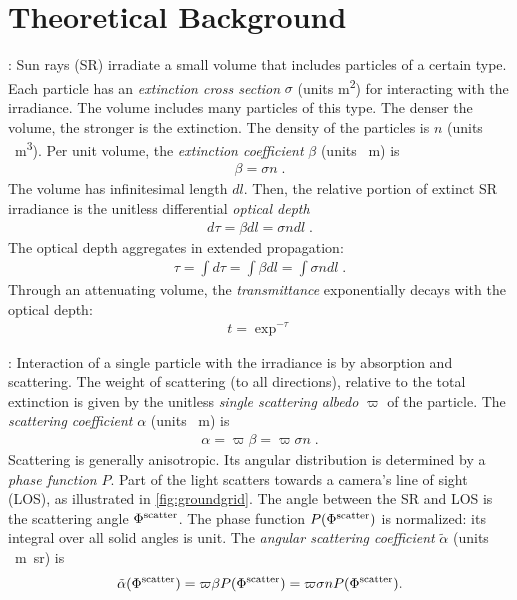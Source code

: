 \documentclass[10pt,letterpaper]{article}
\begin{document}

\section{Theoretical Background}
\label{sec:theor-backgr}

: Sun rays (SR) irradiate a small volume
that includes particles of a certain type.  Each particle has an {\em
  extinction cross section} $\sigma$ (units \si{\meter\squared}) for
interacting with the irradiance. The volume includes many particles of
this type. The denser the volume, the stronger is the extinction.  The
density of the particles is $n$ (units
\si[sticky-per]{\per\cubic\metre}). Per unit volume, the {\em
  extinction coefficient} $\beta$ (units \si{\per\meter}) is
\begin{align}
  \beta= \sigma n \;.
  \label{eq:extinctc}
\end{align}
The volume has infinitesimal length $dl$. Then, the relative portion
of extinct SR irradiance is the unitless differential {\em optical
  depth}
\begin{align}
  d\tau= \beta dl=\sigma n dl \;.
  \label{eq:extinct}
\end{align}
The optical depth aggregates in extended propagation:
\begin{align}
  \tau= \int d\tau=\int \beta dl=\int \sigma n dl \;.
  \label{eq:tau}
\end{align}
Through an attenuating volume, the {\em transmittance} exponentially
decays with the optical depth:
\begin{align}
  t=\exp^{-\tau}
  \label{eq:beer-lambert}
\end{align}

: Interaction of a single particle with the
irradiance is by absorption and scattering. The weight of scattering
(to all directions), relative to the total extinction is given by the
unitless {\em single scattering albedo} $\varpi$ of the particle. The
{\em scattering coefficient} $\alpha$ (units \si{\per\meter}) is
\begin{align}
  \alpha= \varpi\beta=\varpi \sigma n \;.
  \label{eq:alph}
\end{align}
Scattering is generally anisotropic. Its angular distribution is
determined by a {\em phase function} $P$. Part of the light scatters
towards a camera's line of sight (LOS), as illustrated in
\cref{fig:groundgrid}. The angle between the SR and LOS is the
scattering angle $\Phi^{\rm scatter}$. The phase function $P(\Phi^{\rm
  scatter})$ is normalized: its integral over all solid angles is
unit. The {\em angular scattering coefficient} $\tilde\alpha$ (units
\si[sticky-per]{\per\meter\steradian}) is
\begin{align}
  \tilde\alpha(\Phi^{\rm scatter}) = \varpi\beta P(\Phi^{\rm scatter})
  = \varpi \sigma n P(\Phi^{\rm scatter}).
  \label{eq:alphabasic}
\end{align}
\end{document}
